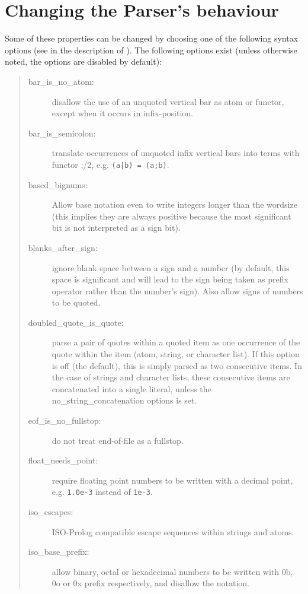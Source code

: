 \section{Changing the Parser's behaviour}
Some of these properties can be changed by choosing one of the following
syntax options (see  in the description of
).
The following options exist (unless otherwise noted, the options are
disabled by default):
\begin{quote}
\begin{description}
\item[bar_is_no_atom:] disallow the use of an unquoted vertical bar as
    atom or functor, except when it occurs in infix-position.
\item[bar_is_semicolon:] translate occurrences of unquoted infix
    vertical bars into terms with functor ;/2, e.g. \verb:(a|b) = (a;b):.
\item[based_bignums:] Allow base notation even to write integers longer
    than the wordsize (this implies they are always positive because the
    most significant bit is not interpreted as a sign bit).
\item[blanks_after_sign:] ignore blank space between a sign and a number
    (by default, this space is significant and will lead to the sign
    being taken as prefix operator rather than the number's sign).
    Also allow signs of numbers to be quoted.
\item[doubled_quote_is_quote:] parse a pair of quotes within a quoted item
    as one occurrence of the quote within the item (atom, string, or character
    list). If this option is off (the default), this is simply parsed as two
    consecutive items.  In the case of strings and character lists, these
    consecutive items are concatenated into a single literal, unless the
    no_string_concatenation options is set.
\item[eof_is_no_fullstop:] do not treat end-of-file as a fullstop.
\item[float_needs_point:] require floating point numbers to be written
    with a decimal point, e.g. \verb:1.0e-3: instead of \verb:1e-3:.
\item[iso_escapes:] ISO-Prolog compatible escape sequences within
    strings and atoms.
\item[iso_base_prefix:] allow binary, octal or hexadecimal numbers to be
  written
    with 0b, 0o or 0x prefix respectively, and disallow the
     notation.

\end{description}
\end{quote}
